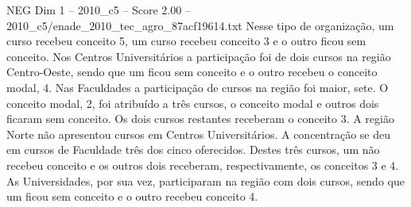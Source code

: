 \begin{textsample}{NEG Dim 1 – 2010\_c5 – Score 2.00 – 2010\_c5/enade\_2010\_tec\_agro\_87acf19614.txt}
Nesse tipo de organização, um curso recebeu conceito 5, um curso recebeu conceito 3 e o outro ficou sem conceito.
Nos Centros Universitários a participação foi de dois cursos na região Centro-Oeste, sendo que um ficou sem conceito e o outro recebeu o conceito modal, 4.
Nas Faculdades a participação de cursos na região foi maior, sete.
O conceito modal, 2, foi atribuído a três cursos, o conceito modal e outros dois ficaram sem conceito.
Os dois cursos restantes receberam o conceito 3.
A região Norte não apresentou cursos em Centros Universitários.
A concentração se deu em cursos de Faculdade três dos cinco oferecidos.
Destes três cursos, um não recebeu conceito e os outros dois receberam, respectivamente, os conceitos 3 e 4.
As Universidades, por sua vez, participaram na região com dois cursos, sendo que um ficou sem conceito e o outro recebeu conceito 4.

\end{textsample}
